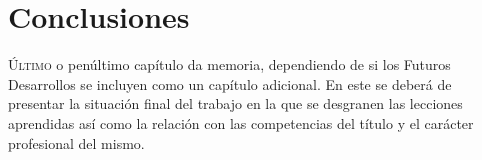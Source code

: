 \chapter{Conclusiones}
\label{chap:conclusions}

\lettrine{Ú}{ltimo} o penúltimo capítulo da memoria, dependiendo de si los Futuros Desarrollos se incluyen como un capítulo adicional.
En este se deberá de presentar la situación final del trabajo en la que se desgranen las lecciones aprendidas así como la relación 
con las competencias del título y el carácter profesional del mismo.

\Blindtext[10]
